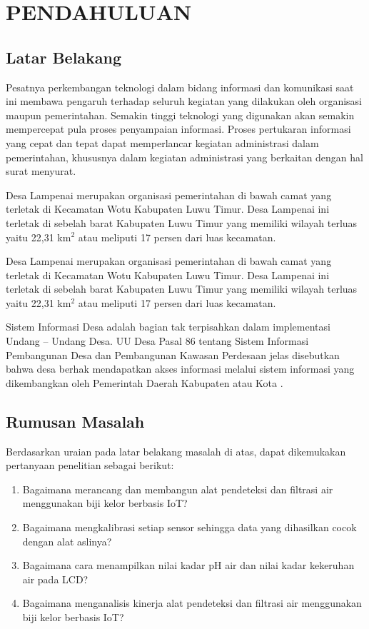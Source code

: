 \chapter{PENDAHULUAN}

\section{Latar Belakang}

Pesatnya perkembangan teknologi dalam bidang informasi dan komunikasi saat ini membawa pengaruh terhadap seluruh kegiatan yang dilakukan oleh organisasi maupun pemerintahan. Semakin tinggi teknologi yang digunakan akan semakin mempercepat pula proses penyampaian informasi. Proses pertukaran informasi yang cepat dan tepat dapat memperlancar kegiatan administrasi dalam pemerintahan, khususnya dalam kegiatan administrasi yang berkaitan dengan hal surat menyurat.

Desa Lampenai merupakan organisasi pemerintahan di bawah camat yang terletak di Kecamatan Wotu Kabupaten Luwu Timur. Desa Lampenai ini terletak di sebelah barat Kabupaten Luwu Timur yang memiliki wilayah terluas yaitu 22,31 km$^2$ atau meliputi 17 persen dari luas kecamatan.

Desa Lampenai merupakan organisasi pemerintahan di bawah camat yang terletak di Kecamatan Wotu Kabupaten Luwu Timur. Desa Lampenai ini terletak di sebelah barat Kabupaten Luwu Timur yang memiliki wilayah terluas yaitu 22,31 km$^2$ atau meliputi 17 persen dari luas kecamatan.

Sistem Informasi Desa adalah bagian tak terpisahkan dalam implementasi Undang – Undang Desa. UU Desa Pasal 86 tentang Sistem Informasi Pembangunan Desa dan Pembangunan Kawasan Perdesaan jelas disebutkan bahwa desa berhak mendapatkan akses informasi melalui sistem informasi yang dikembangkan oleh Pemerintah Daerah Kabupaten atau Kota . 

\section{Rumusan Masalah}

Berdasarkan uraian pada latar belakang masalah di atas, dapat dikemukakan pertanyaan penelitian sebagai berikut:

\begin{enumerate}[topsep=0pt,itemsep=0pt,partopsep=0pt, parsep=0pt]
    \item Bagaimana merancang dan membangun alat pendeteksi dan filtrasi air menggunakan biji kelor berbasis IoT?
    \item Bagaimana mengkalibrasi setiap sensor sehingga data yang dihasilkan cocok dengan alat aslinya?
    \item Bagaimana cara menampilkan nilai kadar pH air dan nilai kadar kekeruhan air pada LCD?
    \item Bagaimana menganalisis kinerja alat pendeteksi dan filtrasi air menggunakan biji kelor berbasis IoT?
\end{enumerate}

